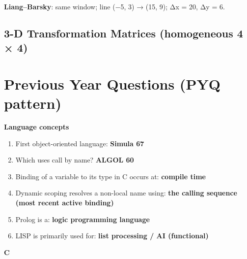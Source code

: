 \textbf{Liang--Barsky}: same window; line (−5, 3) → (15, 9); Δx = 20, Δy = 6.



\needspace{95pt}

\hypertarget{p2-03--76-3-d-transformation-matrices-homogeneous-4--4}{%
\subsection{3-D Transformation Matrices (homogeneous 4 × 4)}\label{p2-03--76-3-d-transformation-matrices-homogeneous-4--4}}



\needspace{125pt}

\hypertarget{p2-03--previous-year-questions-pyq-pattern}{%
\section{Previous Year Questions (PYQ pattern)}\label{p2-03--previous-year-questions-pyq-pattern}}

\textbf{Language concepts}

\begin{enumerate}
\def\labelenumi{\arabic{enumi}.}
\tightlist
\item
  First object-oriented language: \textbf{Simula 67}
\item
  Which uses call by name? \textbf{ALGOL 60}
\item
  Binding of a variable to its type in C occurs at: \textbf{compile time}
\item
  Dynamic scoping resolves a non-local name using: \textbf{the calling sequence (most recent active binding)}
\item
  Prolog is a: \textbf{logic programming language}
\item
  LISP is primarily used for: \textbf{list processing / AI (functional)}
\end{enumerate}

\textbf{C}

